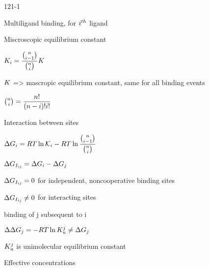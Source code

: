 \begin{mitframe}{121-1}
\begin{listone}
	\item Multiligand binding, for $\state^{th}$ ligand
    \item Miscroscopic equilibrium constant
    		\begin{listtwo}
            	\item $\dilfac_{\state}=\dfrac{\binom{n}{\state-1}}{\binom{n}{\state}}\dilfac$
                \begin{listthree}
                	\item $\dilfac$ => mascropic equilibrium constant, same for all binding events
                    \item $\binom{n}{\state}=\dfrac{n!}{(n-\state)!\state!}$
                \end{listthree}            
            \end{listtwo}
	\item Interaction between sites
    		\begin{listtwo}
            	\item $\iipf\gibbs_{\state}=\gasconst\Temp\ln\partcoeff-\gasconst\Temp\ln\dfrac{\binom{n}{\state-1}}{\binom{n}{\state}}$
                \item $\iipf\gibbs_{\mominertia_{\state{j}}}=\iipf\gibbs_{\state}-\iipf\gibbs_j$
            	\begin{listthree}
                	\item $\iipf\gibbs_{\mominertia_{ij}}=0$ for independent, noncooperative binding sites
                    \item $\iipf\gibbs_{\mominertia_{ij}}\neq{0}$ for interacting sites
                    \begin{listfour}
                    	\item binding of j subsequent to i
                        	\begin{listfive}
                            	\item $\iipf\iipf\gibbs_j=-\gasconst\Temp\ln\dilfac_{\forcepot}^{j}\neq\iipf\gibbs_j$
                                \item $\dilfac_{\forcepot}^j$ is unimolecular equilibrium constant
                            \end{listfive}
                    \end{listfour}
                	\item Effective concentrations

\end{listthree}
\end{listtwo}
\end{listone}
\end{mitframe}
